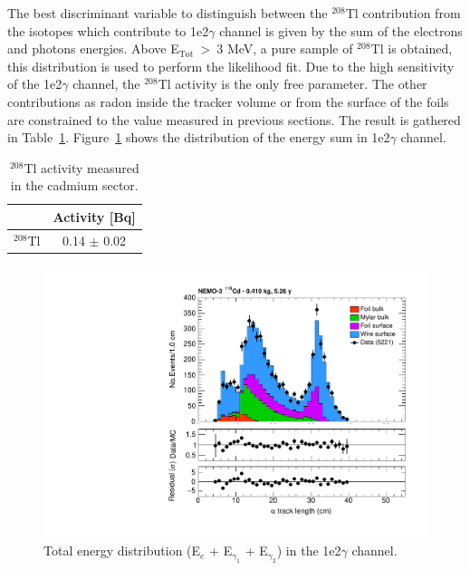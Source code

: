 \documentclass[main.tex]{subfiles}
\begin{document}
\bigskip


\NI The best discriminant variable to distinguish between the $^{\text{208}}$Tl contribution from the isotopes which contribute to 1e2$\gamma$ channel is given by the sum of the electrons and photons energies.  Above E$_{\text{Tot}}~>~$3 MeV, a pure sample of $^{\text{208}}$Tl is obtained, this distribution is used to perform the likelihood fit. Due to the high sensitivity of the 1e2$\gamma$ channel, the $^{\text{208}}$Tl activity is the only free parameter. The other contributions as radon inside the tracker volume or from the surface of the foils are constrained to the value measured in previous sections. The result is gathered in Table~\ref{TableTl208}. Figure~\ref{1e2gChannel_Etot} shows the distribution of the energy sum in 1e2$\gamma$ channel.


\begin{table}[h!]
\centering
\begin{tabular}{c|c}
 & Activity [Bq] \\
\toprule
$^{\text{208}}$Tl & 0.14 $\pm$ 0.02 \\ 
\bottomrule
\end{tabular}
\caption{$^{\text{208}}$Tl activity measured in the cadmium sector.}
\label{TableTl208}
\end{table}



\begin{figure}[h!]
\centering
\includegraphics[page=5,scale=0.55]{pictures/Chap6/FinalPlots.pdf}
\caption{Total energy distribution (E$_e$ + E$_{\gamma_1}$ + E$_{\gamma_2}$) in the 1e2$\gamma$ channel.}
\label{1e2gChannel_Etot}
\end{figure}
\end{document}
